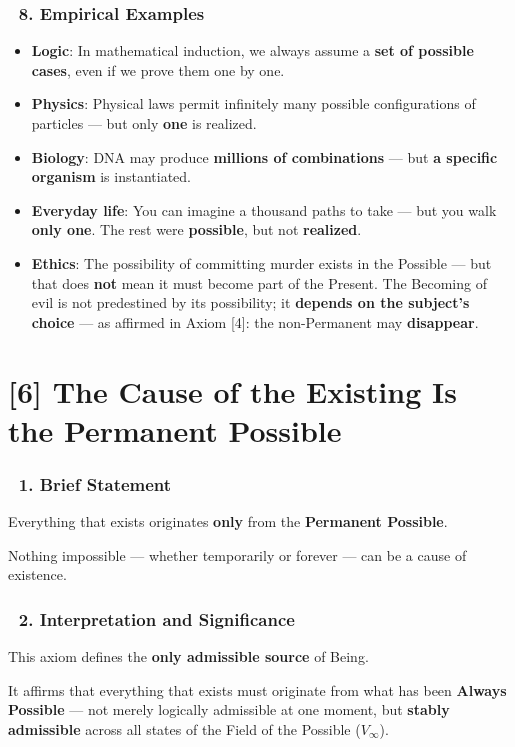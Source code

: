 \documentclass[12pt]{article}
\begin{document}
\subsubsection*{🔹 8. Empirical Examples}
\begin{itemize}
\item \textbf{Logic}: In mathematical induction, we always assume a \textbf{set of possible cases}, even if we prove them one by one.
\item \textbf{Physics}: Physical laws permit infinitely many possible configurations of particles — but only \textbf{one} is realized.
\item \textbf{Biology}: DNA may produce \textbf{millions of combinations} — but \textbf{a specific organism} is instantiated.
\item \textbf{Everyday life}: You can imagine a thousand paths to take — but you walk \textbf{only one}. The rest were \textbf{possible}, but not \textbf{realized}.
\item \textbf{Ethics}: The possibility of committing murder exists in the Possible — but that does \textbf{not} mean it must become part of the Present. The Becoming of evil is not predestined by its possibility; it \textbf{depends on the subject's choice} — as affirmed in Axiom [4]: the non-Permanent may \textbf{disappear}.
\end{itemize}


\section*{[6] The Cause of the Existing Is the Permanent Possible}

\subsubsection*{🔹 1. Brief Statement}
Everything that exists originates \textbf{only} from the \textbf{Permanent Possible}.

Nothing impossible — whether temporarily or forever — can be a cause of existence.

\subsubsection*{🔹 2. Interpretation and Significance}
This axiom defines the \textbf{only admissible source} of Being.

It affirms that everything that exists must originate from what has been \textbf{Always Possible} — not merely logically admissible at one moment, but \textbf{stably admissible} across all states of the Field of the Possible ($V_\infty$).
\end{document}

